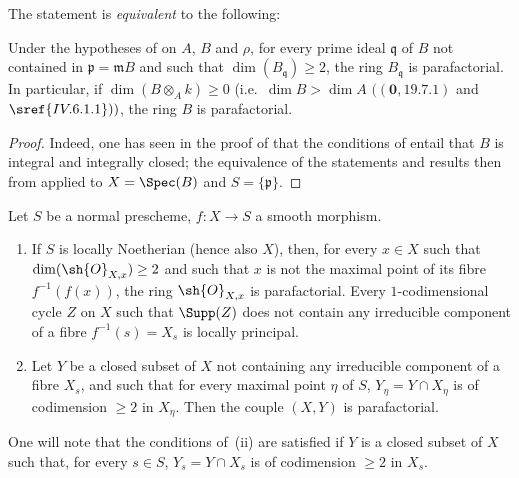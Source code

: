 The statement  is \emph{equivalent} to the following:

\begin{corollary}[21.14.2]
\label{IV.21.14.2}
Under the hypotheses of  on $A$, $B$ and $\rho$, for every prime ideal $\mathfrak{q}$ of $B$ not contained in $\mathfrak{p}=\mathfrak{m}B$ and such that $\dim(B_\mathfrak{q})\geq 2$, the ring $B_\mathfrak{q}$ is parafactorial.
In particular, if $\dim(B\otimes_A k)\geq 0$ (i.e.\ $\dim B>\dim A$ $((\mathbf{0}, 19.7.1)$ and $\sref{IV.6.1.1}))$, the ring $B$ is parafactorial.
\end{corollary}

\begin{proof}
Indeed, one has seen in the proof of  that the conditions of  entail that $B$ is integral and integrally closed; the equivalence of the statements  and  results then from  applied to $X=\Spec(B)$ and $S=\{\mathfrak{p}\}$.
\end{proof}

\begin{proposition}[21.14.3]
\label{IV.21.14.3}
Let $S$ be a normal prescheme, $f:X\to S$ a smooth morphism.
\begin{enumerate}
  \item[(i)] If $S$ is locally Noetherian (hence also $X$), then, for every $x\in X$ such that $\dim(\sh{O}_{X,x})\geq 2$ and such that $x$ is not the maximal point of its fibre $f^{-1}(f(x))$, the ring $\sh{O}_{X,x}$ is parafactorial.
  Every $1$-codimensional cycle $Z$ on $X$ such that $\Supp(Z)$ does not contain any irreducible component of a fibre $f^{-1}(s)=X_s$ is locally principal.
  \item[(ii)] Let $Y$ be a closed subset of $X$ not containing any irreducible component of a fibre $X_s$, and such that for every maximal point $\eta$ of $S$, $Y_\eta=Y\cap X_\eta$ is of codimension $\geq 2$ in $X_\eta$.
  Then the couple $(X,Y)$ is parafactorial.
\end{enumerate}
\end{proposition}

One will note that the conditions of~(ii) are satisfied if $Y$ is a closed subset of $X$ such that, for every $s\in S$, $Y_s=Y\cap X_s$ is of codimension $\geq 2$ in $X_s$.


